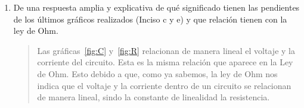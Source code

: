 \documentclass{article}
\begin{document}
\begin{enumerate}[label=\alph*.-]
\begin{quote}
            \begin{table}[ht]
                \centering
                \begin{tabular}{|c|c|c|c|c|} %
                    \midrule    %
                    $n$     & $x$   & $y$       & $x^2$ & $xy$      \\
                    \midrule
                    $1$     & $0$      & $0$    & $0$       & $0$       \\
                    $2$     & $0.28$   & $1$    & $0.0784$  & $0.28$    \\
                    $3$     & $0.63$   & $2$    & $0.3969$  & $1.26$    \\
                    $4$     & $0.9$    & $3$    & $0.81$    & $2.7$     \\
                    $5$     & $1.15$   & $4$    & $1.3225$  & $4.6$     \\
                    $6$     & $1.48$   & $5$    & $2.1904$  & $7.4$     \\
                    \midrule
                    $\sum$  & $4.44$  & $15$    & $4.7982$  & $16.24$   \\
                    \midrule
                \end{tabular}
                \caption{Tabla de datos de la regresión lineal.}
            \end{table}

            Ahora:
            \begin{align*}
                m &= \frac{n \sum xy - \sum x \sum y}{n \sum x^2 - {\left(\sum x\right)}^2}\\[3px]
                m &= \frac{6 (16.24) - 4.44 (15)}{6 (4.7982) - {\left(4.44\right)}^2}\\[3px]
                &\approx 3.398
            \end{align*}

            \[
                \boxed{m \approx 3.398}
            \]
        \end{quote}
        
        \item De una respuesta amplia y explicativa de qué significado tienen las pendientes de los últimos gráficos realizados (Inciso c y e) y que relación tienen con la ley de Ohm.
        
        \begin{quote}
            Las gráficas~\ref{fig:C} y~\ref{fig:R} relacionan de manera lineal el voltaje y la corriente del circuito. Esta es la misma relación que aparece en la Ley de Ohm. Esto debido a que, como ya sabemos, la ley de Ohm nos indica que el voltaje y la corriente dentro de un circuito se relacionan de manera lineal, sindo la constante de linealidad la resistencia.


\end{quote}
\end{enumerate}
\end{document}
